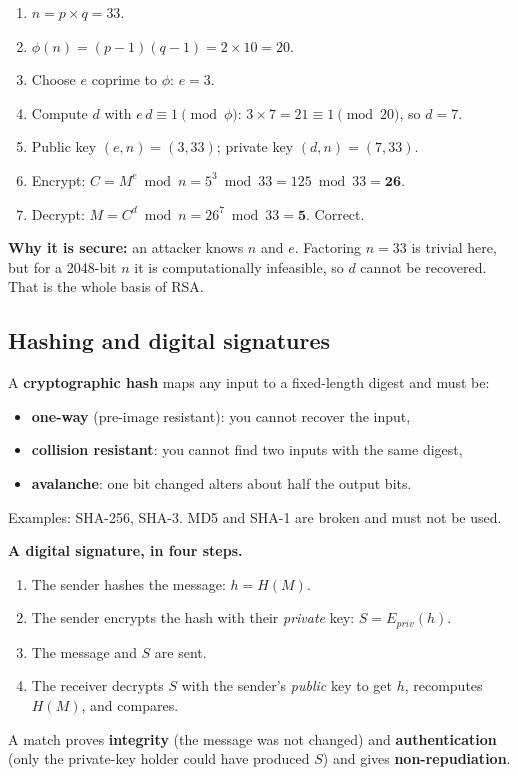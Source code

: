 \documentclass[11pt,a4paper]{article}
\begin{document}
\begin{solbox}
\begin{enumerate}
\item $n = p \times q = 33$.
\item $\phi(n) = (p-1)(q-1) = 2 \times 10 = 20$.
\item Choose $e$ coprime to $\phi$: $e = 3$.
\item Compute $d$ with $e\,d \equiv 1 \pmod{\phi}$: $3 \times 7 = 21 \equiv 1 \pmod{20}$, so $d = 7$.
\item Public key $(e, n) = (3, 33)$; private key $(d, n) = (7, 33)$.
\item Encrypt: $C = M^e \bmod n = 5^3 \bmod 33 = 125 \bmod 33 = \mathbf{26}$.
\item Decrypt: $M = C^d \bmod n = 26^7 \bmod 33 = \mathbf{5}$. Correct.
\end{enumerate}

\textbf{Why it is secure:} an attacker knows $n$ and $e$. Factoring $n = 33$ is trivial here, but for a 2048-bit $n$ it is computationally infeasible, so $d$ cannot be recovered. That is the whole basis of RSA.
\end{solbox}

\subsection{Hashing and digital signatures}

A \textbf{cryptographic hash} maps any input to a fixed-length digest and must be:

\begin{itemize}
\item \textbf{one-way} (pre-image resistant): you cannot recover the input,
\item \textbf{collision resistant}: you cannot find two inputs with the same digest,
\item \textbf{avalanche}: one bit changed alters about half the output bits.
\end{itemize}
Examples: SHA-256, SHA-3. MD5 and SHA-1 are broken and must not be used.

\begin{exambox}
\textbf{A digital signature, in four steps.}
\begin{enumerate}
\item The sender hashes the message: $h = H(M)$.
\item The sender encrypts the hash with their \emph{private} key: $S = E_{priv}(h)$.
\item The message and $S$ are sent.
\item The receiver decrypts $S$ with the sender's \emph{public} key to get $h$, recomputes $H(M)$, and compares.
\end{enumerate}
A match proves \textbf{integrity} (the message was not changed) and \textbf{authentication} (only the private-key holder could have produced $S$) and gives \textbf{non-repudiation}.
\end{exambox}
\end{document}
